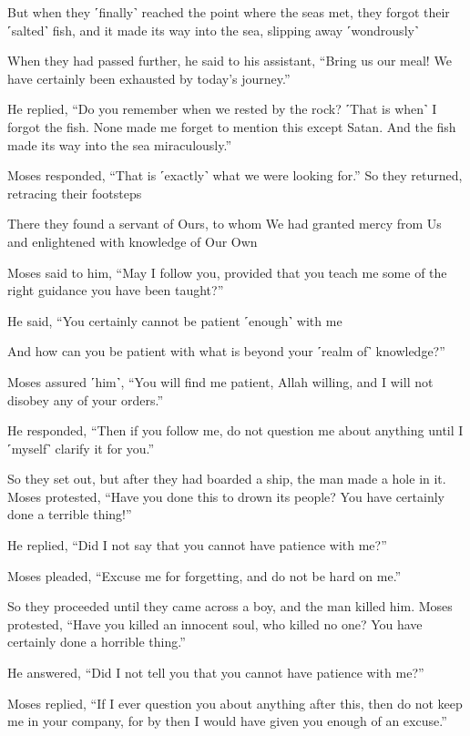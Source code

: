 But when they ˹finally˺ reached the point where the seas met, they forgot their ˹salted˺ fish, and it made its way into the sea, slipping away ˹wondrously˺

When they had passed further, he said to his assistant, “Bring us our meal! We have certainly been exhausted by today’s journey.”

He replied, “Do you remember when we rested by the rock? ˹That is when˺ I forgot the fish. None made me forget to mention this except Satan. And the fish made its way into the sea miraculously.”

Moses responded, “That is ˹exactly˺ what we were looking for.” So they returned, retracing their footsteps

There they found a servant of Ours, to whom We had granted mercy from Us and enlightened with knowledge of Our Own

Moses said to him, “May I follow you, provided that you teach me some of the right guidance you have been taught?”

He said, “You certainly cannot be patient ˹enough˺ with me

And how can you be patient with what is beyond your ˹realm of˺ knowledge?”

Moses assured ˹him˺, “You will find me patient, Allah willing, and I will not disobey any of your orders.”

He responded, “Then if you follow me, do not question me about anything until I ˹myself˺ clarify it for you.”

So they set out, but after they had boarded a ship, the man made a hole in it. Moses protested, “Have you done this to drown its people? You have certainly done a terrible thing!”

He replied, “Did I not say that you cannot have patience with me?”

Moses pleaded, “Excuse me for forgetting, and do not be hard on me.”

So they proceeded until they came across a boy, and the man killed him. Moses protested, “Have you killed an innocent soul, who killed no one? You have certainly done a horrible thing.”

He answered, “Did I not tell you that you cannot have patience with me?”

Moses replied, “If I ever question you about anything after this, then do not keep me in your company, for by then I would have given you enough of an excuse.”

